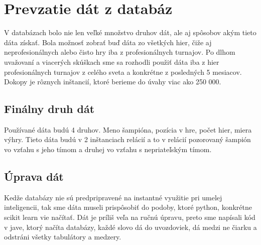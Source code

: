 \section{Prevzatie dát z databáz}
V databázach bolo nie len veľké množstvo druhov dát, ale aj spôsobov akým tieto dáta získať. Bola možnosť zobrať buď dáta zo všetkých hier, čiže aj neprofesionálnych alebo čisto hry iba z profesionálnych turnajov. Po dlhom uvažovaní a viacerých skúškach sme sa rozhodli použiť dáta iba z hier profesionálnych turnajov z celého sveta a konkrétne z posledných 5 mesiacov. Dokopy je rôznych inštancií, ktoré berieme do úvahy viac ako 250 000.

\subsection{Finálny druh dát}
Používané dáta budú 4 druhov. Meno šampióna, pozícia v hre, počet hier, miera výhry. Tieto dáta budú v 2 inštanciach relácií a to v relácií pozorovaný šampión vo vzťahu s jeho tímom a druhej vo vzťahu s nepriateľským tímom.

\subsection{Úprava dát}
Kedže databázy nie sú predpripravené na instantné využitie pri umelej inteligencii, tak sme dáta museli prispôsobiť do podoby, ktoré python, konkrétne scikit learn vie načítať. Dát je príliš veľa na ručnú úpravu, preto sme napísali kód v jave, ktorý načíta databázy, každé slovo dá do uvozdoviek, dá medzi ne čiarku a odstráni všetky tabulátory a medzery.

